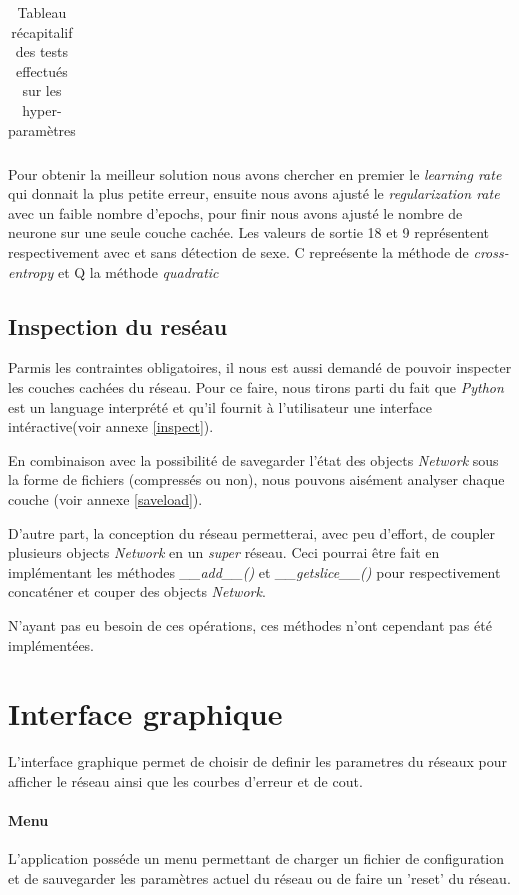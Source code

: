 \documentclass[11pt]{article}
\begin{document}
\begin{table}[h]
\begin{tabular}{|c|c|c|c|c|c|c|c|c|c|c|c|c|c|}
  \hline
\end{tabular}
  \caption{Tableau r\'ecapitalif des tests effectu\'es sur les hyper-param\`etres }
\end{table}
Pour obtenir la meilleur solution nous avons chercher en premier le {\em learning rate}  qui donnait la plus petite erreur, ensuite nous avons ajust\'e le {\em regularization rate} avec un faible nombre d'epochs, pour finir nous avons ajust\'e le nombre de neurone sur une seule couche cach\'ee. 
Les valeurs de sortie 18 et 9  repr\'esentent respectivement avec et sans d\'etection de sexe.
C repre\'esente la m\'ethode de {\em cross-entropy} et Q la m\'ethode {\em quadratic}
\subsection{Inspection du res\'eau}
Parmis les contraintes obligatoires, il nous est aussi demand\'e de pouvoir
inspecter les couches cach\'ees du r\'eseau. Pour ce faire, nous tirons parti du
fait que {\em Python} est un language interpr\'et\'e et qu'il fournit \`a
l'utilisateur une interface int\'eractive(voir annexe \ref{inspect}).

En combinaison avec la possibilit\'e de savegarder l'\'etat des
objects {\em Network} sous la forme de fichiers (compress\'es ou non), nous
pouvons ais\'ement analyser chaque couche (voir annexe \ref{saveload}).

D'autre part, la conception du r\'eseau permetterai, avec peu d'effort, de coupler
plusieurs objects {\em Network} en un {\em super} r\'eseau.
Ceci pourrai \^etre fait en impl\'ementant les m\'ethodes {\em \_\_add\_\_()}
et {\em \_\_getslice\_\_()} pour respectivement concat\'ener et couper des objects
{\em Network}.

N'ayant pas eu besoin de ces op\'erations, ces m\'ethodes n'ont
cependant pas \'et\'e impl\'ement\'ees.

\newpage
\section{Interface graphique}

L'interface graphique permet de choisir de definir les parametres du r\'eseaux
pour afficher le r\'eseau ainsi que les courbes d'erreur et de cout.
\paragraph{Menu} L'application poss\'ede un menu permettant de charger un
fichier de configuration et de sauvegarder les param\`etres actuel du r\'eseau
ou de faire un 'reset' du r\'eseau.
\end{document}
